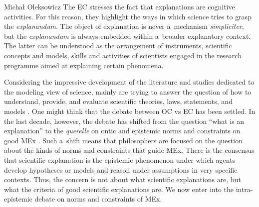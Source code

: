 \begin{artengenv}{Michał Oleksowicz}
The EC stresses the fact that explanations are cognitive activities. For this reason, they highlight the ways in which science tries to grasp the \textit{explanandum}. The object of explanation is never a~mechanism \textit{simpliciter}, but the \textit{explanandum} is always embedded within a~broader explanatory context. The latter can be understood as the arrangement of instruments, scientific concepts and models, skills and activities of scientists engaged in the research programme aimed at explaining certain phenomena.

Considering the impressive development of the literature and studies dedicated to the modeling view of science, mainly are trying to answer the question of how to understand, provide, and evaluate scientific theories, laws, statements, and models
\parencites[][]{meheus_models_2009}[][]{frigg_models_2022}. %
 One might think that the debate between OC vs EC has been settled. In the last decade, however, the debate has shifted from the question ``what is an explanation'' to the \textit{querelle} on ontic and epistemic norms and constraints on good MEx 
\parencite[][]{illari_mechanistic_2013}. %
 Such a~shift means that philosophers are focused on the question about the kinds of norms and constraints that guide MEx. There is the consensus that scientific explanation is the epistemic phenomenon under which agents develop hypotheses or models and reason under assumptions in very specific contexts. Thus, the concern is not about what scientific explanations are, but what the criteria of good scientific explanations are. We now enter into the intra-epistemic debate on norms and constraints of MEx.


\end{artengenv}

